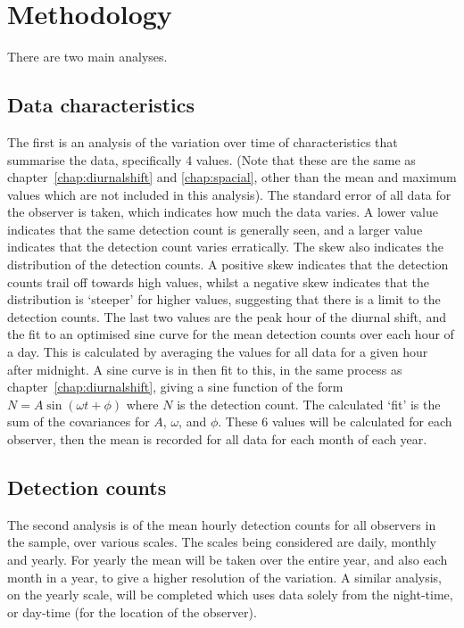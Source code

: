 \section{Methodology}
There are two main analyses. 
\subsection{Data characteristics}
The first is an analysis of the variation over time of characteristics that summarise the data, specifically 4 values. (Note that these are the same as chapter~\ref{chap:diurnalshift} and \ref{chap:spacial}, other than the mean and maximum values which are not included in this analysis). The standard error of all data for the observer is taken, which indicates how much the data varies. A lower value indicates that the same detection count is generally seen, and a larger value indicates that the detection count varies erratically. The skew also indicates the distribution of the detection counts. A positive skew indicates that the detection counts trail off towards high values, whilst a negative skew indicates that the distribution is `steeper' for higher values, suggesting that there is a limit to the detection counts. The last two values are the peak hour of the diurnal shift, and the fit to an optimised sine curve for the mean detection counts over each hour of a day. This is calculated by averaging the values for all data for a given hour after midnight. A sine curve is in then fit to this, in the same process as chapter~\ref{chap:diurnalshift}, giving a sine function of the form $N = A \sin \left( \omega t + \phi \right)$ where $N$ is the detection count. The calculated `fit' is the sum of the covariances for $A$, $\omega$, and $\phi$. These 6 values will be calculated for each observer, then the mean is recorded for all data for each month of each year.
\subsection{Detection counts}
The second analysis is of the mean hourly detection counts for all observers in the sample, over various scales. The scales being considered are daily, monthly and yearly. For yearly the mean will be taken over the entire year, and also each month in a year, to give a higher resolution of the variation. A similar analysis, on the yearly scale, will be completed which uses data solely from the night-time, or day-time (for the location of the observer).

